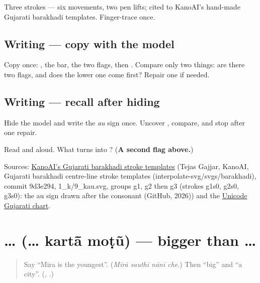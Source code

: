 Three strokes — six movements, two pen lifts; cited to KanoAI's hand-made Gujarati barakhadi templates. Finger-trace \textbf{} once.

\subsection*{Writing — copy with the model}
Copy \textbf{} once: \textbf{}, the bar, the two flags, then \textbf{}. Compare only two things: are there two flags, and does the lower one come first? Repair one if needed.

\subsection*{Writing — recall after hiding}
Hide the model and write the \emph{au} sign once. Uncover \textbf{}, compare, and stop after one repair.

\begin{tcolorbox}[breakable,colback=teal!4,colframe=teal!35!black,title={Before you move on}]
Read \textbf{} and \textbf{} aloud. What turns \textbf{} into \textbf{}? (\textbf{A second flag above.})

Sources: \href{https://github.com/gajjartejas/KanoAI/tree/9d3e2949a3f265448e430e15329093ea3aa516b8/interpolate-svg/svgs/barakhadi}{KanoAI's Gujarati barakhadi stroke templates} (Tejas Gajjar, KanoAI, Gujarati barakhadi centre-line stroke templates (interpolate-svg/svgs/barakhadi), commit 9d3e294, 1\_k/9\_kau.svg, groups g1, g2 then g3 (strokes g1s0, g2s0, g3s0): the au sign drawn after the consonant (GitHub, 2026)) and the \href{https://www.unicode.org/charts/PDF/U0A80.pdf}{Unicode Gujarati chart}.
\end{tcolorbox}
\section[\texorpdfstring{… \gu{કરતાં} \gu{મોટું} (… kartā̃ moṭũ)}{… કરતાં મોટું (… kartā̃ moṭũ)}]{…   (… kartā̃ moṭũ) — bigger than …}

\label{lesson:GU-C282-kartan}



\begin{quote}
Say \textquotedblleft{}Mira is the youngest\textquotedblright{}. (\emph{Mīrā sauthī nānī che}.) Then \textquotedblleft{}big\textquotedblright{} and \textquotedblleft{}a city\textquotedblright{}. (\textbf{}, \textbf{}.)
\end{quote}

